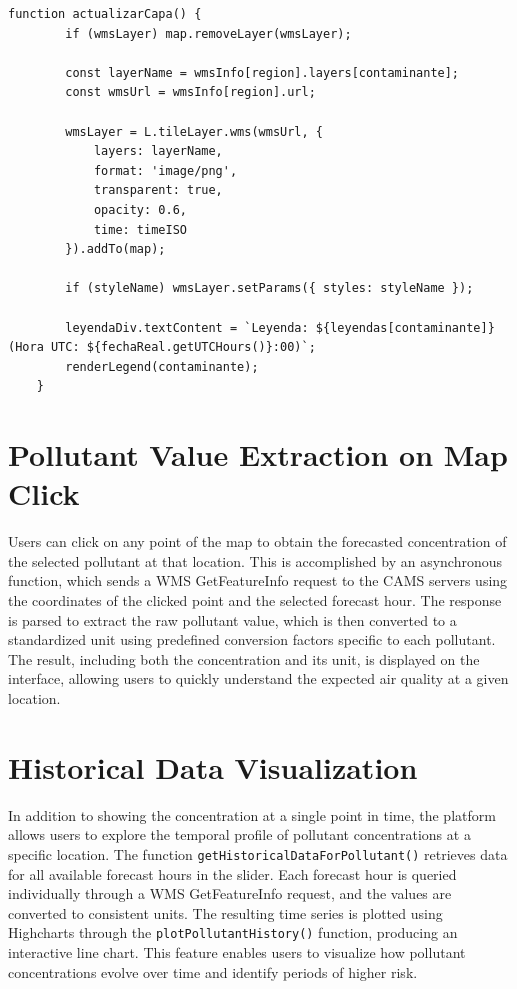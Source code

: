 \begin{lstlisting}[caption={Updating the map layer for the selected pollutant and hour}]
	function actualizarCapa() {
		if (wmsLayer) map.removeLayer(wmsLayer);
		
		const layerName = wmsInfo[region].layers[contaminante];
		const wmsUrl = wmsInfo[region].url;
		
		wmsLayer = L.tileLayer.wms(wmsUrl, {
			layers: layerName,
			format: 'image/png',
			transparent: true,
			opacity: 0.6,
			time: timeISO
		}).addTo(map);
		
		if (styleName) wmsLayer.setParams({ styles: styleName });
		
		leyendaDiv.textContent = `Leyenda: ${leyendas[contaminante]} (Hora UTC: ${fechaReal.getUTCHours()}:00)`;
		renderLegend(contaminante);
	}
\end{lstlisting}

\section{Pollutant Value Extraction on Map Click}
Users can click on any point of the map to obtain the forecasted concentration of the selected pollutant at that location. This is accomplished by an asynchronous function, which sends a WMS GetFeatureInfo request to the CAMS servers using the coordinates of the clicked point and the selected forecast hour. The response is parsed to extract the raw pollutant value, which is then converted to a standardized unit using predefined conversion factors specific to each pollutant. The result, including both the concentration and its unit, is displayed on the interface, allowing users to quickly understand the expected air quality at a given location.


\section{Historical Data Visualization}
In addition to showing the concentration at a single point in time, the platform allows users to explore the temporal profile of pollutant concentrations at a specific location. The function \texttt{getHistoricalDataForPollutant()} retrieves data for all available forecast hours in the slider. Each forecast hour is queried individually through a WMS GetFeatureInfo request, and the values are converted to consistent units. The resulting time series is plotted using Highcharts through the \texttt{plotPollutantHistory()} function, producing an interactive line chart. This feature enables users to visualize how pollutant concentrations evolve over time and identify periods of higher risk.


